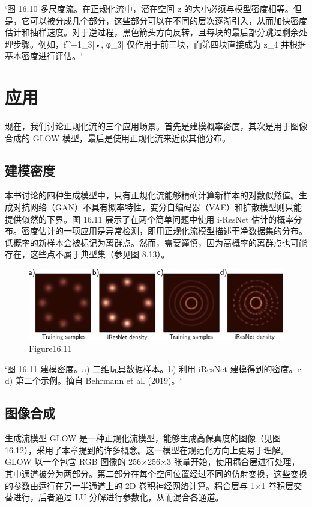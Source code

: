 `图 16.10 多尺度流。在正规化流中，潜在空间 z 的大小必须与模型密度相等。但是，它可以被分成几个部分，这些部分可以在不同的层次逐渐引入，从而加快密度估计和抽样速度。对于逆过程，黑色箭头方向反转，且每块的最后部分跳过剩余处理步骤。例如，f^{−1}_3[•, φ_3] 仅作用于前三块，而第四块直接成为 z_4 并根据基本密度进行评估。`

\section{应用}
现在，我们讨论正规化流的三个应用场景。首先是建模概率密度，其次是用于图像合成的 GLOW 模型，最后是使用正规化流来近似其他分布。

\subsection{建模密度}

本书讨论的四种生成模型中，只有正规化流能够精确计算新样本的对数似然值。生成对抗网络（GAN）不具有概率特性，变分自编码器（VAE）和扩散模型则只能提供似然的下界。图 16.11 展示了在两个简单问题中使用 i-ResNet 估计的概率分布。密度估计的一项应用是异常检测，即用正规化流模型描述干净数据集的分布。低概率的新样本会被标记为离群点。然而，需要谨慎，因为高概率的离群点也可能存在，这些点不属于典型集（参见图 8.13）。

\begin{figure}[h!]
\centering
\includegraphics[width=0.7\linewidth]{png/chapter16/FlowIResNetResults.png}
\caption{Figure16.11}
\end{figure}

`图 16.11 建模密度。a) 二维玩具数据样本。b) 利用 iResNet 建模得到的密度。c–d) 第二个示例。摘自 Behrmann et al. (2019)。`

\subsection{图像合成}
生成流模型 GLOW 是一种正规化流模型，能够生成高保真度的图像（见图 16.12），采用了本章提到的许多概念。这一模型在规范化方向上更易于理解。GLOW 以一个包含 RGB 图像的 256×256×3 张量开始，使用耦合层进行处理，其中通道被分为两部分。第二部分在每个空间位置经过不同的仿射变换，这些变换的参数由运行在另一半通道上的 2D 卷积神经网络计算。耦合层与 1×1 卷积层交替进行，后者通过 LU 分解进行参数化，从而混合各通道。

